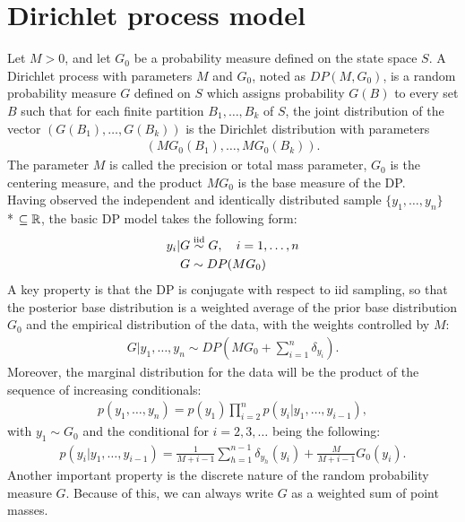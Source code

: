 \section{Dirichlet process model}
Let $M>0$, and let $G_0$ be a probability measure defined on the state space $S$.
A Dirichlet process with parameters $M$ and $G_0$, noted as $DP(M,G_0)$, is a random probability measure $G$ defined on $S$ which assigns probability $G(B)$ to every set $B$ such that for each finite partition ${B_1,\dots,B_k}$ of $S$, the joint distribution of the  vector $(G(B_1),\dots,G(B_k))$ is the Dirichlet distribution with parameters
\begin{align*}
(MG_0(B_1),\dots,MG_0(B_k)).
\end{align*}
The parameter $M$ is called the precision or total mass parameter, $G_0$ is the centering measure, and the product $MG_0$ is the base measure of the DP. \\
Having observed the independent and identically distributed sample $\{y_1,\dots,y_n\}$ \\*
$\subseteq \mathbb R$, the basic DP model takes the following form:
\begin{equation}
	\begin{aligned}
	y_i | G &\stackrel{\text{iid}}{\sim} G, \quad i=1,\dots,n \\
	G &\sim DP(MG_0)
	\end{aligned}
\end{equation}
A key property is that the DP is conjugate with respect to iid sampling, so that the posterior base distribution is a weighted average of the prior base distribution $G_0$ and the empirical distribution of the data, with the weights controlled by $M$:
\begin{align}
	G | y_1,\dots,y_n \sim DP\left(M G_0 + \sum_{i=1}^n \delta_{y_i}\right).
\end{align}
Moreover, the marginal distribution for the data will be the product of the sequence of increasing conditionals:
\begin{align*}
	p(y_1,\dots,y_n)= p(y_1)\prod\limits_{i=2}^{n} p(y_i|y_1,\dots,y_{i-1}),
\end{align*}
with $y_1 \sim G_0$ and the conditional for $i=2,3,\dots$ being the following:
\begin{align*}
	p(y_i|y_1,\dots,y_{i-1})= \frac{1}{M+i-1}\sum_{h=1}^{n-1} \delta_{y_h}(y_i) +\frac{M}{M+i-1} G_0(y_i).
\end{align*}
Another important property is the discrete nature of the random probability measure $G$.
Because of this, we can always write $G$ as a weighted sum of point masses.
